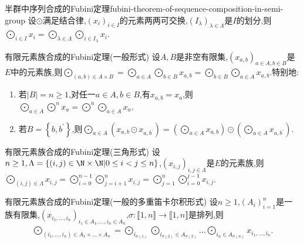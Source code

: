 \begin{theorem}{半群中序列合成的Fubini定理}{fubini-theorem-of-sequence-composition-in-semi-group}
	设$\odot$满足结合律,$\left(x_{i}\right)_{i\in I}$的元素两两可交换,$\left(I_{\lambda}\right)_{\lambda\in\Lambda}$是$I$的划分,则$\bigodot\limits_{i\in I}x_{i}=\bigodot\limits_{\lambda\in\Lambda}\bigodot\limits_{i\in I_{\lambda}}x_{i}$.
\end{theorem}

\begin{corollary}{有限元素族合成的Fubini定理(一般形式)}{}
	设$A,B$是非空有限集,$\left(x_{a,b}\right)_{a\in A,b\in B}$是$E$中的元素族,则$\bigodot\limits_{\left(a,b\right)\in A\times B}=\bigodot\limits_{a\in A}\bigodot\limits_{b\in B}x_{a,b}=\bigodot\limits_{b\in B}\bigodot\limits_{a\in A}x_{a,b}$.特别地:
	\begin{enumerate}
		\item 若$\left|B\right|=n\geq 1$,对任一$a\in A,b\in B$,有$x_{a,b}=x_{a}$,则$\bigodot\limits_{a\in A}\bigodot\limits^{n}x_{a}=\bigodot\limits^{n}\bigodot\limits_{a\in A}x_{a}$.
		\item 若$B=\left\{b,b^{\prime}\right\}$,则$\bigodot\limits_{a\in A}\left(x_{a,b}\odot x_{a,b^{\prime}}\right)=\left(\bigodot\limits_{a\in A}x_{a,b}\right)\odot\left(\bigodot\limits_{a\in A}x_{a,b^{\prime}}\right)$.
	\end{enumerate}
\end{corollary}

\begin{corollary}{有限元素族合成的Fubini定理(三角形式)}{}
	设$n\geq 1,\Lambda=\left\{\left(i,j\right)\in\N\times\N\middle|0\leq i<j\leq n\right\}$,$\left(x_{i,j}\right)_{i,j\in\Lambda}$是$E$的元素族,则$\bigodot\limits_{\left(i,j\right)\in \Lambda}x_{i,j}=\bigodot\limits_{i=0}^{n-1}\bigodot\limits_{j=i+1}^{n}x_{i,j}=\bigodot\limits_{j=1}^{n}\bigodot\limits_{i=0}^{j-1}x_{i,j}$.
\end{corollary}

\begin{corollary}{有限元素族合成的Fubini定理(一般的多重笛卡尔积形式)}{}
	设$n\geq 1$,$\left(A_{i}\right)_{i=1}^{n}$是一族有限集,$\left(x_{i_{1},\ldots,i_{n}}\right)_{i_{1}\in A_{1},\ldots,i_{n}\in A_{n}}$,$\sigma:\llbracket 1,n\rrbracket\to\llbracket 1,n\rrbracket$是排列,则
	\begin{align*}
		\bigodot\limits_{\left(i_{1},\ldots,i_{n}\right)\in A_{1}\times\ldots\times A_{n}}=\bigodot\limits_{i_{\sigma\left(1\right)}}\bigodot\limits_{i_{\sigma\left(2\right)}\in A_{\sigma\left(2\right)}}\ldots\bigodot\limits_{i_{n}\in A_{\sigma\left(n\right)}}x_{i_{1},\ldots,i_{n}}.
	\end{align*}
\end{corollary}

